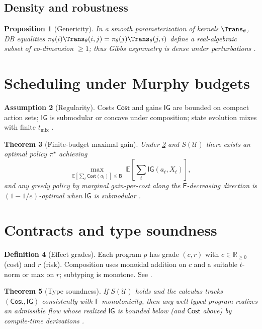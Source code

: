 \documentclass[11pt]{article}
\theoremstyle{plain}
\newtheorem{theorem}{Theorem}[section]
\newtheorem{proposition}[theorem]{Proposition}
\theoremstyle{definition}
\newtheorem{definition}[theorem]{Definition}
\newtheorem{assumption}[theorem]{Assumption}
\theoremstyle{remark}
\newcommand{\EE}{\mathbb{E}}
\newcommand{\RR}{\mathbb{R}}
\newcommand{\1}{\mathds{1}}
\newcommand{\U}{\mathcal{U}}
\newcommand{\Budget}{\mathsf{B}}
\newcommand{\Cost}{\mathsf{Cost}}
\newcommand{\Gain}{\mathsf{IG}}
\newcommand{\Free}{\mathsf{F}}
\begin{document}
\subsection{Density and robustness}
\begin{proposition}[Genericity]\label{prop:density}
In a smooth parameterization of kernels $\Trans_\theta$, DB equalities $\pi_\theta(i)\Trans_\theta(i,j)=\pi_\theta(j)\Trans_\theta(j,i)$ define a real-algebraic subset of co-dimension $\ge 1$; thus Gibbs asymmetry is dense under perturbations \cite{BochnakCosteRoy1998,Kolmogorov1936}.
\end{proposition}

\section{Scheduling under Murphy budgets}
\begin{assumption}[Regularity]\label{assump:regularity}
Costs $\Cost$ and gains $\Gain$ are bounded on compact action sets; $\Gain$ is submodular or concave under composition; state evolution mixes with finite $t_{\mathrm{mix}}$ \cite{LevinPeresWilmer2009}.
\end{assumption}

\begin{theorem}[Finite-budget maximal gain]\label{thm:murphy}
Under \cref{assump:regularity} and $S(\U)$ there exists an optimal policy $\pi^\star$ achieving
\[
\max_{\EE[\sum_t \Cost(a_t)]\le \Budget}\; \EE\!\left[\sum_t \Gain(a_t,X_t)\right],
\]
and any greedy policy by marginal gain-per-cost along the $\Free$-decreasing direction is $(1-1/e)$-optimal when $\Gain$ is submodular \cite{Nemhauser1978}.
\end{theorem}

\section{Contracts and type soundness}
\begin{definition}[Effect grades]
Each program $p$ has grade $(c,r)$ with $c\in\RR_{\ge 0}$ (cost) and $r$ (risk). Composition uses monoidal addition on $c$ and a suitable $t$-norm or max on $r$; subtyping is monotone. See \cite{GradedEffects2025,MeasureContracts2025}.
\end{definition}

\begin{theorem}[Type soundness]\label{thm:typesafety}
If $S(\U)$ holds and the calculus tracks $(\Cost,\Gain)$ consistently with $\Free$-monotonicity, then any well-typed program realizes an admissible flow whose realized $\Gain$ is bounded below (and $\Cost$ above) by compile-time derivations \cite{GradedEffects2025,MeasureContracts2025}.
\end{theorem}
\end{document}
